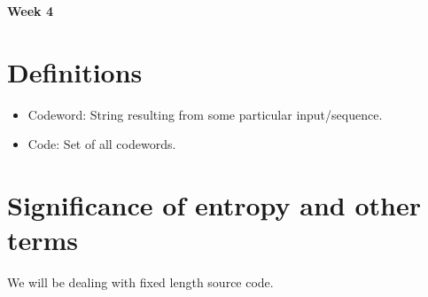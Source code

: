 \documentclass{article}
\begin{document}
\begin{center}
\textbf{\huge{Week 4}}
\end{center}

\section{Definitions}
\begin{itemize}
    \item Codeword: String resulting from some particular input/sequence.
    \item Code: Set of all codewords.
\end{itemize}

\section{Significance of entropy and other terms}

We will be dealing with fixed length source code.
\end{document}
